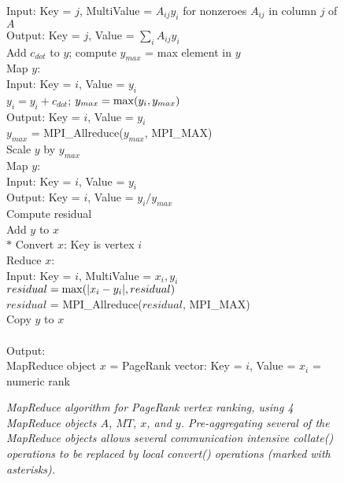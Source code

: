 \begin{figure}[htb]
\begin{center}
{\begin{minipage}{\textwidth}
\begin{tabbing}
\> \> \> Input: Key = $j$, MultiValue = $A_{ij} y_i$ for nonzeroes $A_{ij}$ in column $j$ of $A$ \\
\> \> \> Output: Key = $j$, Value = $\sum_i A_{ij} y_i$ \\
 Add $c_{dot}$ to $y$; compute $y_{max}$ = max element in $y$ \\
\> \> Map $y$:  \\
\> \> \> Input: Key = $i$, Value = $y_i$ \\
\> \> \> $y_i = y_i + c_{dot}$; $y_{max} = {\rm max}(y_i,y_{max})$ \\
\> \> \> Output:  Key = $i$, Value = $y_i$ \\
\> \> $y_{max}$ = MPI\_Allreduce($y_{max}$, MPI\_MAX) \\
 Scale $y$ by $y_{max}$ \\
\> \> Map $y$: \\
\> \> \> Input:  Key = $i$, Value = $y_i$ \\
\> \> \> Output:  Key = $i$, Value = $y_i / y_{max}$ \\
 Compute residual \\
\> \> Add $y$ to $x$ \\
$*$\> \> Convert $x$:  Key is vertex $i$ \\
\> \> Reduce $x$:  \\
\> \> \> Input: Key = $i$, MultiValue = $x_i, y_i$ \\
\> \> \> $residual = {\rm max}(|x_i - y_i|,residual)$ \\
\> \> $residual$ = MPI\_Allreduce($residual$, MPI\_MAX) \\
 Copy $y$ to $x$ \\
\\
Output: \\
\> MapReduce object $x$ = PageRank vector: Key = $i$, Value = $x_i$ = numeric rank 

  \end{tabbing}
 \end{minipage}}\end{center}

 \caption{\it MapReduce algorithm for PageRank vertex ranking, using 4
 MapReduce objects $A$, $MT$, $x$, and $y$.  Pre-aggregating several
 of the MapReduce objects allows several communication intensive {\it
 collate()} operations to be replaced by local {\it convert()}
 operations (marked with asterisks).}

 \label{fig:pr2}
\end{figure}

